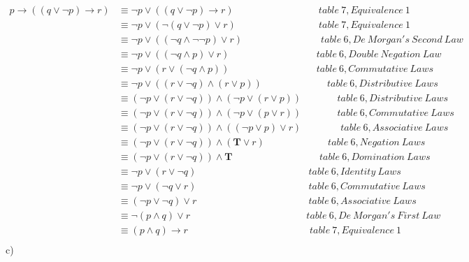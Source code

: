 \documentclass[12pt]{article}
\begin{document}
\begin{equation*}
\begin{split}
 p \rightarrow ((q\lor \neg p)\rightarrow r) &\equiv \neg p \lor ((q \lor \neg p) \rightarrow r)\ \qquad \qquad \qquad \qquad \ \ table\ 7, Equivalence \ 1\\
 &\equiv \neg p \lor (\neg(q \lor \neg p) \lor r)\ \qquad \qquad \qquad \qquad \ table\ 7, Equivalence\ 1\\
 &\equiv \neg p \lor ((\neg q \wedge \neg \neg p) \lor r) \qquad \qquad \qquad \qquad  table\ 6, De\ Morgan's\ Second\ Law \\ &\equiv \neg p \lor ((\neg q \wedge p) \lor r)  \qquad \qquad \qquad \qquad \ \ \ \ table\ 6, Double\ Negation\ Law\\
 &\equiv \neg p \lor (r \lor (\neg q \wedge p)) \qquad \qquad \qquad \qquad \ \ \ \ table\ 6, Commutative\ Laws\\
 &\equiv \neg p \lor ((r\lor \neg q) \wedge (r \lor p)) \ \quad \quad \qquad \ \qquad \ table\ 6, Distributive\ Laws\\
 &\equiv (\neg p \lor (r \lor \neg q)) \wedge (\neg p \lor (r \lor p)) \ \ \quad \qquad \ table\ 6, Distributive\ Laws\\
 &\equiv (\neg p \lor (r \lor \neg q)) \wedge (\neg p \lor (p \lor r)) \quad \ \ \qquad \ table\ 6, Commutative\ Laws\\
 &\equiv (\neg p \lor (r \lor \neg q)) \wedge ((\neg p \lor p) \lor r) \quad \quad \qquad  table\ 6, Associative\ Laws\\
 &\equiv (\neg p \lor (r \lor \neg q)) \wedge (\textbf{T} \lor r) \ \ \qquad \qquad \qquad table\ 6, Negation\ Laws\\
 &\equiv (\neg p \lor (r \lor \neg q)) \wedge \textbf{T} \ \ \ \qquad \qquad \qquad \qquad \ table\ 6, Domination\ Laws\\
 &\equiv \neg p \lor (r \lor \neg q) \ \qquad \qquad \quad \qquad \qquad \qquad \ table\ 6, Identity\ Laws\\
 &\equiv \neg p \lor (\neg q \lor r) \ \qquad \quad \qquad \qquad \qquad \qquad \ table\ 6, Commutative\ Laws\\
 &\equiv (\neg p \lor \neg q) \lor r \ \qquad \qquad \quad \qquad \qquad \qquad \ table\ 6, Associative\ Laws\\
 &\equiv \neg(p \wedge q) \lor r\ \ \ \qquad \qquad \qquad \quad \qquad \qquad \ table\ 6, De\ Morgan's\ First\ Law\\
 &\equiv (p \wedge q) \rightarrow r \ \qquad \qquad \qquad \qquad \qquad \qquad\ table\ 7, Equivalence\ 1\\
\end{split}
\end{equation*}
\newpage
c)\\
\end{document}
